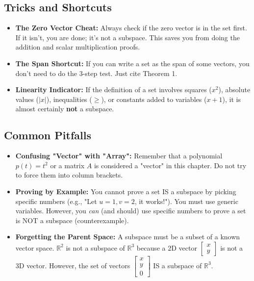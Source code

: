 \documentclass[12pt]{article}
\begin{document}
\subsection{Tricks and Shortcuts}
\begin{itemize}
    \item \textbf{The Zero Vector Cheat:} Always check if the zero vector is in the set first. If it isn't, you are done; it's not a subspace. This saves you from doing the addition and scalar multiplication proofs.
    \item \textbf{The Span Shortcut:} If you can write a set as the span of some vectors, you don't need to do the 3-step test. Just cite Theorem 1.
    \item \textbf{Linearity Indicator:} If the definition of a set involves squares ($x^2$), absolute values ($|x|$), inequalities ($\ge$), or constants added to variables ($x+1$), it is almost certainly \textbf{not} a subspace.
\end{itemize}

\subsection{Common Pitfalls}
\begin{itemize}
    \item \textbf{Confusing "Vector" with "Array":} Remember that a polynomial $p(t) = t^2$ or a matrix $A$ is considered a "vector" in this chapter. Do not try to force them into column brackets.
    \item \textbf{Proving by Example:} You cannot prove a set IS a subspace by picking specific numbers (e.g., "Let $u=1, v=2$, it works!"). You must use generic variables. However, you \textit{can} (and should) use specific numbers to prove a set is NOT a subspace (counterexample).
    \item \textbf{Forgetting the Parent Space:} A subspace must be a subset of a known vector space. $\mathbb{R}^2$ is not a subspace of $\mathbb{R}^3$ because a 2D vector $\begin{bmatrix} x \\ y \end{bmatrix}$ is not a 3D vector. However, the set of vectors $\begin{bmatrix} x \\ y \\ 0 \end{bmatrix}$ IS a subspace of $\mathbb{R}^3$.
\end{itemize}
\end{document}
